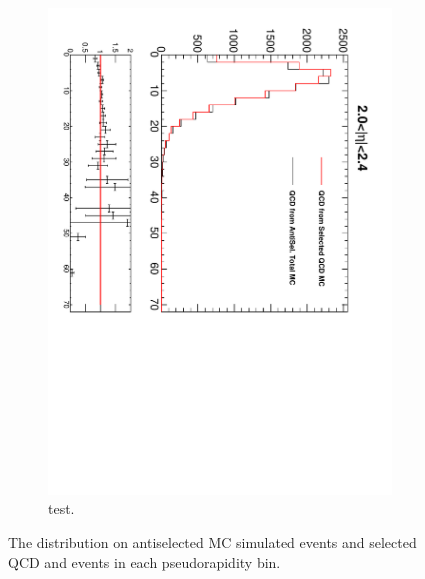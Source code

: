 \begin{figure}[htbp]
\begin{subfigure}{0.45\textwidth}
    \includegraphics*[trim = 0mm 0mm 15mm 0mm, clip, width=\textwidth, angle=90]{MetCompare_anti_eta6.pdf}
    \caption{test.}
    \label{fig:qcd_met_eta6}
  \end{subfigure}
  \caption{The \ETm distribution on antiselected \ac{MC} simulated events and selected \ac{QCD} and \gjet events in each pseudorapidity bin.}
  \label{tab:antiselclosure}
\end{figure}

